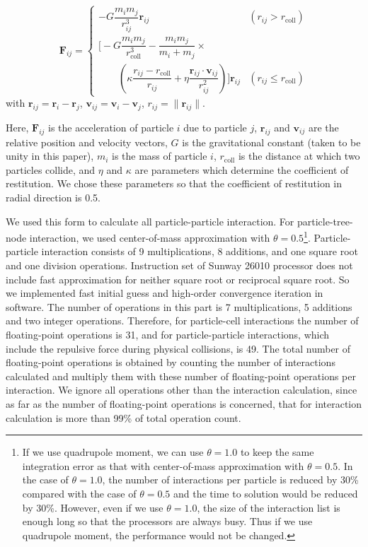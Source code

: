 \documentclass[Afour,sageh,times]{sagej}
\newcommand{\rev}[1]{{#1}}
\begin{document}
{%
\begin{equation}
  \bm F_{ij} = \begin{cases} -G \dfrac{m_i m_j}
    {r_{ij}^3} \bm r_{ij} & \left(r_{ij} > r_\text{coll} \right)
    \\
    \Biggl[  -G \dfrac{m_i m_j} {r_\text{coll}^3}  - \dfrac{m_i m_j}{m_i
        + m_j}  \times \\ \qquad  \left(      \kappa \dfrac{r_{ij} -
        r_\text{coll}}{r_{ij}}    + \eta \dfrac{\bm r_{ij} \cdot \bm
        v_{ij}}{r_{ij}^2}    \right) \Biggr] \bm r_{ij} & \left(
    r_{ij} \le r_\text{coll} \right) \end{cases}
  \label{eq:interaction} 
\end{equation}
}
with
$\bm r_{ij} = \bm r_i - \bm r_j$, $\bm v_{ij} = \bm v_i - \bm v_j$,
$r_{ij} = \| \bm r_{ij} \|$.




Here, ${\bm F_{ij}}$ is the acceleration of particle $i$ due to
particle $j$, ${\bm r_{ij}}$ and ${\bm v_{ij}}$ are the relative
position and velocity vectors, $G$ is the gravitational constant
(taken to be unity in this paper), $m_i$ is the mass of particle $i$,
$r_\text{coll}$ is the distance at which two particles collide, and
$\eta$ and $\kappa$ are parameters which determine the coefficient of
restitution. We chose these parameters so that the coefficient of
restitution in radial direction is 0.5.

We used this form to calculate all particle-particle interaction. For
particle-tree-node interaction, we used center-of-mass approximation
with $\theta=0.5$\footnote{\rev{If we use quadrupole moment, we can
    use $\theta=1.0$ to keep the same integration error as that with
    center-of-mass approximation with $\theta=0.5$. In the case of
    $\theta=1.0$, the number of interactions per particle is reduced
    by 30\% compared with the case of $\theta=0.5$ and the time to
    solution would be reduced by 30\%. However, even if we use
    $\theta=1.0$, the size of the interaction list is enough long so
    that the processors are always busy. Thus if we use quadrupole
    moment, the performance would not be changed.}}. Particle-particle
interaction consists of 9 multiplications, 8 additions, and one square
root and one division operations. Instruction set of Sunway 26010
processor does not include fast approximation for neither square root
or reciprocal square root. So we implemented fast initial guess and
high-order convergence iteration in software. The number of operations
in this part is 7 multiplications, 5 additions and two integer
operations. Therefore, for particle-cell interactions the number of
floating-point operations is 31, and for particle-particle
interactions, which include the repulsive force during physical
collisions, is 49.  The total number of floating-point operations is
obtained by counting the number of interactions calculated and
multiply them with these number of floating-point operations per
interaction. We ignore all operations other than the interaction
calculation, since as far as the number of floating-point operations
is concerned, that for interaction calculation is more than 99\% of
total operation count.
\end{document}
